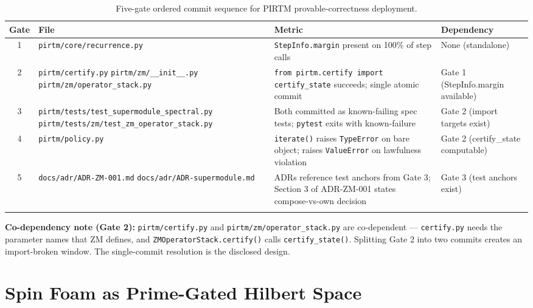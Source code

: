 \documentclass[12pt,letterpaper]{article}
\theoremstyle{definition}
\theoremstyle{remark}
\begin{document}
\begin{longtable}{cllp{4.5cm}}
\toprule
\textbf{Gate} & \textbf{File} & \textbf{Metric} & \textbf{Dependency} \\
\midrule
1 & \texttt{pirtm/core/recurrence.py} &
    \texttt{StepInfo.margin} present on 100\% of step calls &
    None (standalone) \\[4pt]

2 & \texttt{pirtm/certify.py} \newline
    \texttt{pirtm/zm/\_\_init\_\_.py} \newline
    \texttt{pirtm/zm/operator\_stack.py} &
    \texttt{from pirtm.certify import certify\_state} succeeds;
    single atomic commit &
    Gate 1 (StepInfo.margin available) \\[4pt]

3 & \texttt{pirtm/tests/test\_supermodule\_spectral.py} \newline
    \texttt{pirtm/tests/zm/test\_zm\_operator\_stack.py} &
    Both committed as known-failing spec tests;
    \texttt{pytest} exits with known-failure &
    Gate 2 (import targets exist) \\[4pt]

4 & \texttt{pirtm/policy.py} &
    \texttt{iterate()} raises \texttt{TypeError} on bare object;
    raises \texttt{ValueError} on lawfulness violation &
    Gate 2 (certify\_state computable) \\[4pt]

5 & \texttt{docs/adr/ADR-ZM-001.md} \newline
    \texttt{docs/adr/ADR-supermodule.md} &
    ADRs reference test anchors from Gate 3;
    Section 3 of ADR-ZM-001 states compose-vs-own decision &
    Gate 3 (test anchors exist) \\
\bottomrule
\caption{Five-gate ordered commit sequence for PIRTM provable-correctness deployment.}
\end{longtable}

\textbf{Co-dependency note (Gate 2):} \texttt{pirtm/certify.py} and
\texttt{pirtm/zm/operator\_stack.py} are co-dependent --- \texttt{certify.py}
needs the parameter names that ZM defines, and \texttt{ZMOperatorStack.certify()}
calls \texttt{certify\_state()}. Splitting Gate 2 into two commits creates an
import-broken window. The single-commit resolution is the disclosed design.

\section{Spin Foam as Prime-Gated Hilbert Space}
\label{sec:spin-foam}
\end{document}
